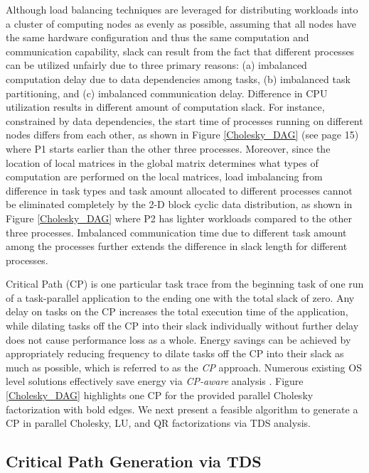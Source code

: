 \documentclass[12pt]{elsarticle}
\begin{document}
Although load balancing techniques are leveraged for distributing workloads into a cluster of computing nodes as evenly as possible, assuming that all nodes have the same hardware configuration and thus the same computation and communication capability, slack can result from the fact that different processes can be utilized unfairly due to three primary reasons: (a) imbalanced computation delay due to data dependencies among tasks, (b) imbalanced task partitioning, and (c) imbalanced communication delay. Difference in CPU utilization results in different amount of computation slack. For instance, constrained by data dependencies, the start time of processes running on different nodes differs from each other, as shown in Figure \ref{Cholesky_DAG} (see page 15) where \textsf{P1} starts earlier than the other three processes. Moreover, since the location of local matrices in the global matrix determines what types of computation are performed on the local matrices, load imbalancing from difference in task types and task amount allocated to different processes cannot be eliminated completely by the 2-D block cyclic data distribution, as shown in Figure \ref{Cholesky_DAG} where \textsf{P2} has lighter workloads compared to the other three processes. Imbalanced communication time due to different task amount among the processes further extends the difference in slack length for different processes.

Critical Path (CP) is one particular task trace from the beginning task of one run of a task-parallel application to the ending one with the total slack of zero. Any delay on tasks on the CP increases the total execution time of the application, while dilating tasks off the CP into their slack individually without further delay does not cause performance loss as a whole. Energy savings can be achieved by appropriately reducing frequency to dilate tasks off the CP into their slack as much as possible, which is referred to as the \emph{CP} approach. Numerous existing OS level solutions effectively save energy via \emph{CP-aware} analysis \cite{ipdps05a} \cite{sc06} \cite{sc07} \cite{ics09} \cite{hpcs11} \cite{csrd12a}. Figure \ref{Cholesky_DAG} highlights one CP for the provided parallel Cholesky factorization with bold edges. We next present a feasible algorithm to generate a CP in parallel Cholesky, LU, and QR factorizations via TDS analysis.

\subsection{Critical Path Generation via TDS}
\end{document}
